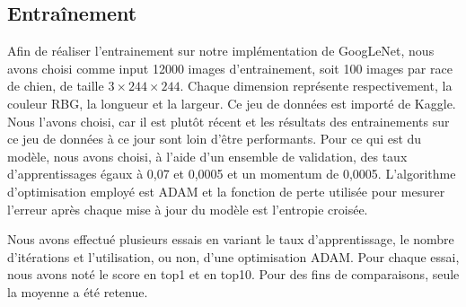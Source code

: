 \documentclass{article}
\begin{document}
\subsection{Entraînement}
Afin de réaliser l’entrainement sur notre implémentation de GoogLeNet, nous
avons choisi comme input 12000 images d’entrainement, soit 100 images par race
de chien, de taille $3\times 244 \times 244$. Chaque dimension représente
respectivement, la couleur RBG, la longueur et la largeur. Ce jeu de données est
importé de Kaggle. Nous l’avons choisi, car il est plutôt récent et les
résultats des entrainements sur ce jeu de données à ce jour sont loin d’être
performants. Pour ce qui est du modèle, nous avons choisi, à l’aide d’un
ensemble de validation, des taux d’apprentissages égaux à 0,07 et 0,0005 et
un momentum de 0,0005. L’algorithme d’optimisation employé est ADAM et la
fonction de perte utilisée pour mesurer l’erreur après chaque mise à jour du
modèle est l'entropie croisée.

Nous avons effectué plusieurs essais en variant le taux d'apprentissage, le
nombre d'itérations et l'utilisation, ou non, d'une optimisation ADAM. Pour
chaque essai, nous avons noté le score en top1 et en top10. Pour des fins de
comparaisons, seule la moyenne a été retenue.
\end{document}
